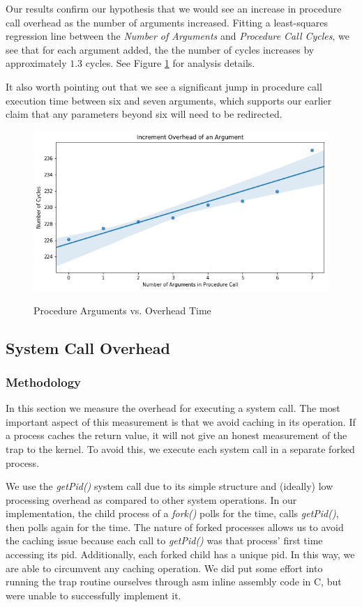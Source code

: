 \documentclass[sigconf]{acmart}
\begin{document}
Our results confirm our hypothesis that we would see an increase in procedure call overhead as the number of arguments increased. Fitting a least-squares regression line between the \textit{Number of Arguments} and \textit{Procedure Call Cycles}, we see that for each argument added, the the number of cycles increases by approximately $1.3$ cycles. See Figure \ref{ProcedureCallRegPlot} for analysis details.

It also worth pointing out that we see a significant jump in procedure call execution time between six and seven arguments, which supports our earlier claim that any parameters beyond six will need to be redirected.

\begin{figure}[h]
\caption{Procedure Arguments vs. Overhead Time}
\includegraphics[scale=0.40]{images/procedure_call_overhead_regplot.png}
\label{ProcedureCallRegPlot}
\end{figure}

\subsection{System Call Overhead}
\subsubsection{Methodology}
In this section we measure the overhead for executing a system call. The most important aspect of this measurement is that we avoid caching in its operation. If a process caches the return value, it will not give an honest measurement of the trap to the kernel. To avoid this, we execute each system call in a separate forked process. 

We use the \textit{getPid()} system call due to its simple structure and (ideally) low processing overhead as compared to other system operations. In our implementation, the child process of a \textit{fork()} polls for the time, calls \textit{getPid()}, then polls again for the time. The nature of forked processes allows us to avoid the caching issue because each call to \textit{getPid()} was that process' first time accessing its pid. Additionally, each forked child has a unique pid. In this way, we are able to circumvent any caching operation. We did put some effort into running the trap routine ourselves through asm inline assembly code in C, but were unable to successfully implement it.
\end{document}
